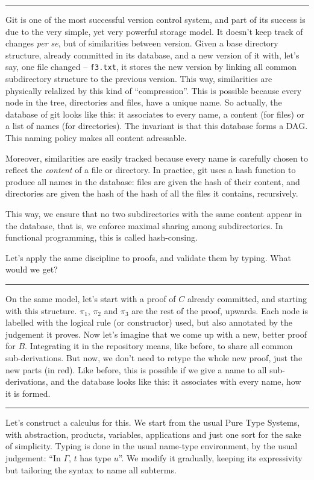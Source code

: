 \documentclass[12pt]{article}
\newcommand{\slide}{\vspace{1em} \hrule \vspace{1em}}
\begin{document}
\slide

\textsf{Git} is one of the most successful version control system, and
part of its success is due to the very simple, yet very powerful
storage model. It doesn't keep track of changes \emph{per se}, but of
similarities between version. Given a base directory structure,
already committed in its database, and a new version of it with, let's
say, one file changed -- \texttt{f3.txt}, it stores the new version by
linking all common subdirectory structure to the previous
version. This way, similarities are physically relalized by this kind
of ``compression''. This is possible because every node in the tree,
directories and files, have a unique name. So actually, the database
of \textsf{git} looks like this: it associates to every name, a
content (for files) or a list of names (for directories). The
invariant is that this database forms a DAG. This naming policy makes
all content adressable.

Moreover, similarities are easily tracked because every name is
carefully chosen to reflect the \emph{content} of a file or directory.
In practice, \textsf{git} uses a hash function to produce all names in
the database: files are given the hash of their content, and
directories are given the hash of the hash of all the files it
contains, recursively.

This way, we ensure that no two subdirectories with the same content
appear in the database, that is, we enforce maximal sharing among
subdirectories. In functional programming, this is called
hash-consing.

Let's apply the same discipline to proofs, and validate them by
typing. What would we get?

\slide

On the same model, let's start with a proof of $C$ already committed,
and starting with this structure. $\pi_1$, $\pi_2$ and $\pi_3$ are the
rest of the proof, upwards. Each node is labelled with the logical
rule (or constructor) used, but also annotated by the judgement it
proves. Now let's imagine that we come up with a new, better proof for
$B$. Integrating it in the repository means, like before, to share all
common sub-derivations. But now, we don't need to retype the whole new
proof, just the new parts (in red). Like before, this is possible if
we give a name to all sub-derivations, and the database looks like
this: it associates with every name, how it is formed.

\slide

Let's construct a calculus for this. We start from the usual Pure Type
Systems, with abstraction, products, variables, applications and just
one sort for the sake of simplicity. Typing is done in the usual
name-type environment, by the usual judgement: ``In $\Gamma$, $t$ has
type $u$''. We modify it gradually, keeping its expressivity but
tailoring the syntax to name all subterms.
\end{document}
